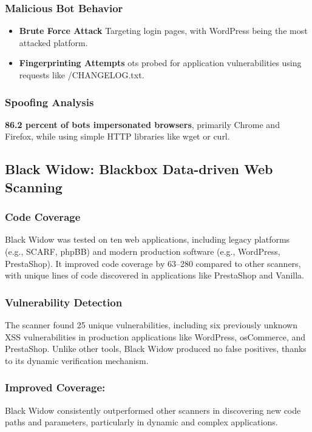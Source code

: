 \documentclass[conference]{IEEEtran}
\begin{document}
\subsubsection{Malicious Bot Behavior}
\begin{itemize}
    \item \textbf{Brute Force Attack} Targeting login pages, with WordPress being the most attacked platform.
    \item \textbf{Fingerprinting Attempts} ots probed for application vulnerabilities using requests like /CHANGELOG.txt.
\end{itemize}
   
\subsubsection{Spoofing Analysis}
\textbf {86.2 percent of bots impersonated browsers}, primarily Chrome and Firefox, while using simple HTTP libraries like wget or curl.

\subsection{\textbf{Black Widow: Blackbox Data-driven Web Scanning}}

\subsubsection{Code Coverage}
Black Widow was tested on ten web applications, including legacy platforms (e.g., SCARF, phpBB) and modern production software (e.g., WordPress, PrestaShop). It improved code coverage by 63–280 compared to other scanners, with unique lines of code discovered in applications like PrestaShop and Vanilla.

\subsubsection{Vulnerability Detection}
The scanner found 25 unique vulnerabilities, including six previously unknown XSS vulnerabilities in production applications like WordPress, osCommerce, and PrestaShop. Unlike other tools, Black Widow produced no false positives, thanks to its dynamic verification mechanism.

\subsubsection{Improved Coverage:}
Black Widow consistently outperformed other scanners in discovering new code paths and parameters, particularly in dynamic and complex applications.
\end{document}
